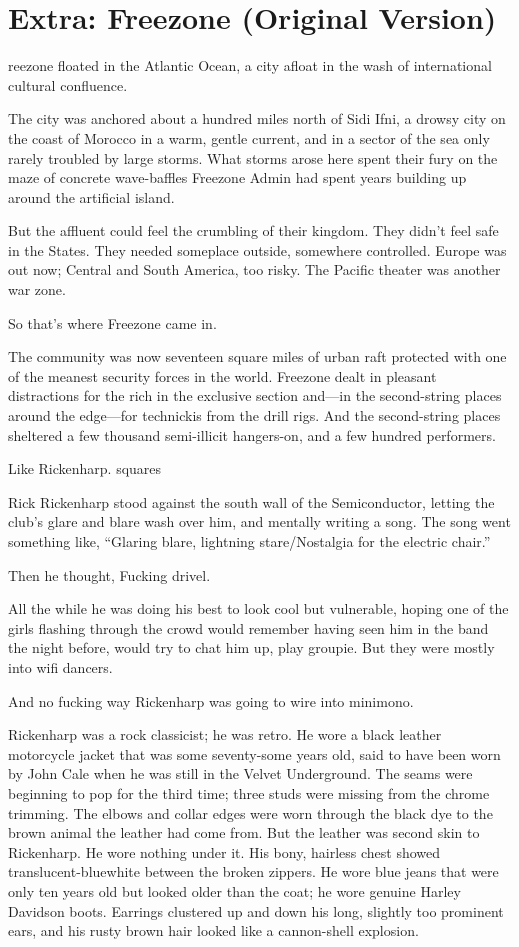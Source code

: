 \chapter{Extra: Freezone (Original Version)}

reezone floated in the Atlantic Ocean, a city afloat in the wash of international cultural confluence.

The city was anchored about a hundred miles north of Sidi Ifni, a drowsy city on the coast of Morocco in a warm, gentle current, and in a sector of the sea only rarely troubled by large storms. What storms arose here spent their fury on the maze of concrete wave-baffles Freezone Admin had spent years building up around the artificial island.

But the affluent could feel the crumbling of their kingdom. They didn’t feel safe in the States. They needed someplace outside, somewhere controlled. Europe was out now; Central and South America, too risky. The Pacific theater was another war zone.

So that’s where Freezone came in.

The community was now seventeen square miles of urban raft protected with one of the meanest security forces in the world. Freezone dealt in pleasant distractions for the rich in the exclusive section and—in the second-string places around the edge—for technickis from the drill rigs. And the second-string places sheltered a few thousand semi-illicit hangers-on, and a few hundred performers.

Like Rickenharp.
squares

Rick Rickenharp stood against the south wall of the Semiconductor, letting the club’s glare and blare wash over him, and mentally writing a song. The song went something like, “Glaring blare, lightning stare/Nostalgia for the electric chair.”

Then he thought, Fucking drivel.

All the while he was doing his best to look cool but vulnerable, hoping one of the girls flashing through the crowd would remember having seen him in the band the night before, would try to chat him up, play groupie. But they were mostly into wifi dancers.

And no fucking way Rickenharp was going to wire into minimono.

Rickenharp was a rock classicist; he was retro. He wore a black leather motorcycle jacket that was some seventy-some years old, said to have been worn by John Cale when he was still in the Velvet Underground. The seams were beginning to pop for the third time; three studs were missing from the chrome trimming. The elbows and collar edges were worn through the black dye to the brown animal the leather had come from. But the leather was second skin to Rickenharp. He wore nothing under it. His bony, hairless chest showed translucent-bluewhite between the broken zippers. He wore blue jeans that were only ten years old but looked older than the coat; he wore genuine Harley Davidson boots. Earrings clustered up and down his long, slightly too prominent ears, and his rusty brown hair looked like a cannon-shell explosion.

